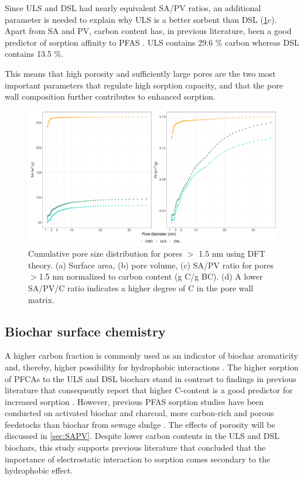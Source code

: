 Since ULS and DSL had nearly equivalent SA/PV ratios, an additional parameter is needed to explain why ULS is a better sorbent than DSL (\cref{fig:PZD_large}c). Apart from SA and PV, carbon content has, in previous literature, been a good predictor of sorption affinity to PFAS \citep{Hale2016,Cornelissen2005}. ULS contains 29.6 \% carbon whereas DSL contains 13.5 \%.  

 This means that high porosity and sufficiently large pores are the two most important parameters that regulate high sorption capacity, and that the pore wall composition further contributes to enhanced sorption. 

\begin{figure}[htb]
    \centering
    \includegraphics[width=\textwidth]{R/figs/PZD_SAPV_C_large.pdf}
    \caption{Cumulative pore size distribution for pores $>$ 1.5 nm using DFT theory. (a) Surface area, (b) pore volume, (c) SA/PV ratio for pores $>$1.5 nm normalized to carbon content (g C/g BC). (d) A lower SA/PV/C ratio indicates a higher degree of C in the pore wall matrix.}
    \label{fig:PZD_large}
\end{figure}

\subsection{Biochar surface chemistry}
A higher carbon fraction is commonly used as an indicator of biochar aromaticity and, thereby, higher possibility for hydrophobic interactions \citep{Cornelissen2005}. The higher sorption of PFCAs to the ULS and DSL biochars stand in contrast to findings in previous literature that consequently report that higher C-content is a good predictor for increased sorption \citep{fabregat2022examining}. However, previous PFAS sorption studies have been conducted on activated biochar and charcoal, more carbon-rich and porous feedstocks than biochar from sewage sludge \citep{Sormo2021, zhang2021sorption}. The effects of porosity will be discussed in \cref{sec:SAPV}. Despite lower carbon contents in the ULS and DSL biochars, this study supports previous literature that concluded that the importance of electrostatic interaction to sorption comes secondary to the hydrophobic effect. 

